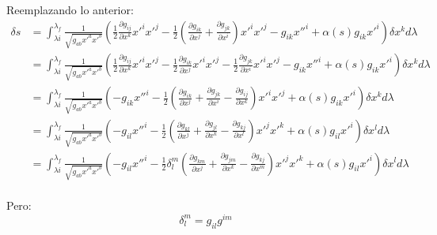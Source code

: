\documentclass[paper=a4, fontsize=11pt,twoside]{scrartcl}
\begin{document}
Reemplazando lo anterior:
	\begin{align*}
		\delta s &=  \int^{\lambda_{f}}_{\lambda{i}} \frac{1}{\sqrt{g_{ab}x'^{a}x'^{b}}} \left( \frac{1}{2}\frac{\partial g_{ij}}{\partial x^{k}} x'^{i}x'^{j} 
				                                    - \frac{1}{2} \left( \frac{\partial g_{ik}}{\partial x^{j}} + \frac{\partial g_{jk}}{\partial x^{i}} \right) x'^{i}x'^{j} - g_{ik}x''^{i} 
				                                        + \alpha\left( s \right) g_{ik}x'^{i} 
														\right) \delta x^{k}  d\lambda\\	
				 &=  \int^{\lambda_{f}}_{\lambda{i}} \frac{1}{\sqrt{g_{ab}x'^{a}x'^{b}}} \left( 
													\frac{1}{2}\frac{\partial g_{ij}}{\partial x^{k}} x'^{i}x'^{j} 
				                                    - \frac{1}{2}\frac{\partial g_{ik}}{\partial x^{j}}x'^{i}x'^{j} - \frac{1}{2}\frac{\partial g_{jk}}{\partial x^{i}} x'^{i}x'^{j} - g_{ik}x''^{i} 
				                                        + \alpha\left( s \right) g_{ik}x'^{i} 
														\right) \delta x^{k}  d\lambda \\
				 &=  \int^{\lambda_{f}}_{\lambda{i}} \frac{1}{\sqrt{g_{ab}x'^{a}x'^{b}}} \left( - g_{ik}x''^{i}
													-\frac{1}{2}\left( \frac{\partial g_{ik}}{\partial x^{j}} + \frac{\partial g_{jk}}{\partial x^{i}}-\frac{\partial g_{ij}}{\partial x^{k}} \right)x'^{i}x'^{j}
				                                        + \alpha \left( s \right) g_{ik}x'^{i} 
														\right) \delta x^{k}  d\lambda \\
				 &=  \int^{\lambda_{f}}_{\lambda{i}} \frac{1}{\sqrt{g_{ab}x'^{a}x'^{b}}} \left( - g_{il}x''^{i}
													-\frac{1}{2}\left( \frac{\partial g_{kl}}{\partial x^{j}} + \frac{\partial g_{jl}}{\partial x^{k}}-\frac{\partial g_{kj}}{\partial x^{l}} \right)x'^{j}x'^{k}
				                                        + \alpha\left( s \right) g_{il}x'^{i} 
														\right) \delta x^{l}  d\lambda \\	
				 &=  \int^{\lambda_{f}}_{\lambda{i}} \frac{1}{\sqrt{g_{ab}x'^{a}x'^{b}}} \left( - g_{il}x''^{i}
													-\frac{1}{2}\delta^{m}_{l}\left( \frac{\partial g_{km}}{\partial x^{j}} + \frac{\partial g_{jm}}{\partial x^{k}}-\frac{\partial g_{kj}}{\partial x^{m}} \right)x'^{j}x'^{k}
				                                        + \alpha\left( s \right) g_{il}x'^{i} 
														\right) \delta x^{l}  d\lambda \\																																												
	\end{align*}

Pero:
	\begin{equation*}
		\delta^{m}_{l} = g_{il}g^{im}
	\end{equation*}
\end{document}
